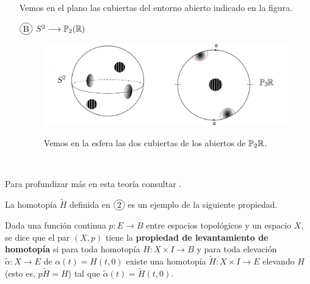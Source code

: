 \documentclass[GTS.tex]{subfiles}
\begin{document}
\begin{nota}
\begin{itemize}

Vemos en el plano las cubiertas del entorno abierto indicado en la figura.
\vspace{0.2cm}

\item[$\circled{B}$] $S^2\longrightarrow\mathbb{P}_2(\mathbb{R})$
\begin{figure}[h!]
	\includegraphics[scale=0.3]{text7103}
	
Vemos en la esfera las dos cubiertas de los abiertos de $\mathbb{P}_2\mathbb{R}$.
\end{figure}\
\end{itemize}
Para profundizar más en esta teoría consultar \cite{Hatcher}.
\end{nota}


La homotopía $\widetilde{H}$ definida en $\circled{2}$ es un ejemplo de la siguiente propiedad.

\begin{defi}
Dada una función continua $p:E\to B$ entre espacios topológicos y un espacio $X$, se dice que el par $(X,p)$ tiene la \textbf{propiedad de levantamiento de homotopía} si para toda homotopía $H:X\times I\to B$ y para toda elevación $\tilde{\alpha}:X\to E$ de $\alpha(t)=H(t,0)$ existe una homotopía $\widetilde{H}:X\times I\to E$ elevando $H$ (esto es, $p\widetilde{H}=H$) tal que $\tilde{\alpha}(t)=\widetilde{H}(t,0)$. 
\end{defi}
\end{document}
